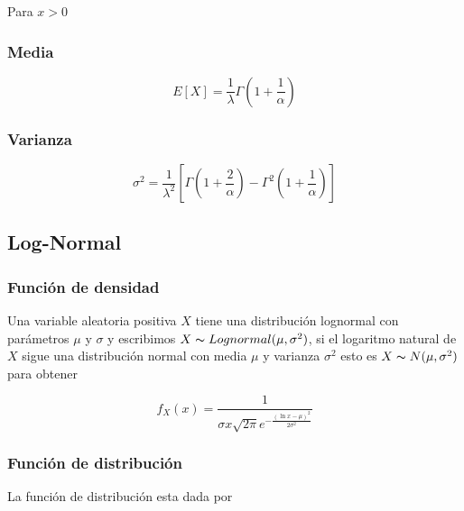 \documentclass{article}
\begin{document}
                Para $x>0$

            \subsubsection{Media}

                \begin{equation*}
                    E[X] = \frac{1}{\lambda} \Gamma \left( 1+\frac{1}{\alpha} \right)
                \end{equation*}
                
            \subsubsection{Varianza}

                \begin{equation*}
                    \sigma ^2 = \frac{1}{\lambda ^2} \left[ \Gamma \left( 1+\frac{2}{\alpha} \right) -\Gamma ^2 \left( 1+\frac{1}{\alpha} \right) \right]
                \end{equation*}

                
        \subsection{Log-Normal}

            \subsubsection{Función de densidad}

                Una variable aleatoria positiva $X$ tiene una distribución lognormal con parámetros $\mu$  y $\sigma$ y escribimos $X\thicksim Lognormal (\mu, \sigma ^2)$, si el logaritmo natural de $X$ sigue una distribución normal con media $\mu$  y varianza $ \sigma ^2$ esto es  $X\thicksim N (\mu, \sigma ^2)$ para obtener

                    \begin{equation*}
                        f_X (x) = \frac{1}{\sigma x\sqrt{2\pi}e^{-\frac{(\ln x-\mu)^2}{2\sigma ^2}}}
                    \end{equation*}

            \subsubsection{Función de distribución}

                La función de distribución esta dada por
\end{document}
